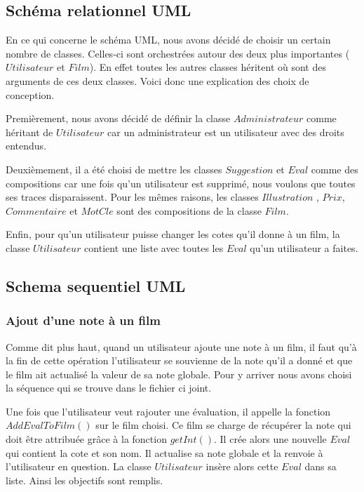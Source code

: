 \documentclass[10pt,a4paper]{article}
\begin{document}
\subsection{Schéma relationnel UML}

    En ce qui concerne le schéma UML, nous avons décidé de choisir un certain nombre de classes. Celles-ci sont orchestrées autour des deux plus importantes ($Utilisateur$ et $Film$). En effet toutes les autres classes héritent où sont des arguments de ces deux classes. Voici donc une explication des choix de conception.

    

    

    Premièrement, nous avons décidé de définir la classe $Administrateur$ comme héritant de $Utilisateur$ car un administrateur est un utilisateur avec des droits entendus.

    

    Deuxièmement, il a été choisi de mettre les classes $Suggestion$ et $Eval$ comme des compositions car une fois qu'un utilisateur est supprimé, nous voulons que toutes ses traces disparaissent. Pour les mêmes raisons, les classes $Illustration$ , $Prix$, $Commentaire$ et $MotCle$ sont des compositions de la classe $Film$.

    

    Enfin, pour qu'un utilisateur puisse changer les cotes qu'il donne à un film, la classe $Utilisateur$ contient une liste avec toutes les $Eval$ qu'un utilisateur a faites.

    

        

\subsection{Schema sequentiel UML}

    \subsubsection{Ajout d'une note à un film}

    Comme dit plus haut, quand un utilisateur ajoute une note à un film, il faut qu'à la fin de cette opération l'utilisateur se souvienne de la note qu'il a donné et que le film ait actualisé la valeur de sa note globale. Pour y arriver nous avons choisi la séquence qui se trouve dans le fichier ci joint.

    

    Une fois que l'utilisateur veut rajouter une évaluation, il appelle la fonction $AddEvalToFilm()$ sur le film choisi. Ce film se charge de récupérer la note qui doit être attribuée grâce à la fonction $getInt()$. Il crée alors une nouvelle $Eval$ qui contient la cote et son nom. Il actualise sa note globale et la renvoie à l'utilisateur en question. La classe $Utilisateur$ insère alors cette $Eval$ dans sa liste. Ainsi les objectifs sont remplis.
\end{document}
